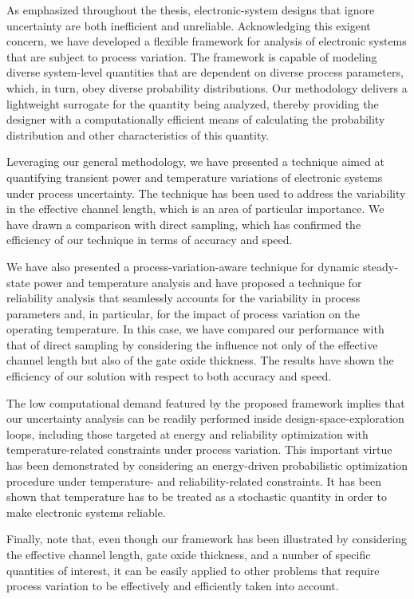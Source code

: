 As emphasized throughout the thesis, electronic-system designs that ignore
uncertainty are both inefficient and unreliable. Acknowledging this exigent
concern, we have developed a flexible framework for analysis of electronic
systems that are subject to process variation. The framework is capable of
modeling diverse system-level quantities that are dependent on diverse process
parameters, which, in turn, obey diverse probability distributions. Our
methodology delivers a lightweight surrogate for the quantity being analyzed,
thereby providing the designer with a computationally efficient means of
calculating the probability distribution and other characteristics of this
quantity.

Leveraging our general methodology, we have presented a technique aimed at
quantifying transient power and temperature variations of electronic systems
under process uncertainty. The technique has been used to address the
variability in the effective channel length, which is an area of particular
importance. We have drawn a comparison with direct sampling, which has confirmed
the efficiency of our technique in terms of accuracy and speed.

We have also presented a process-variation-aware technique for dynamic
steady-state power and temperature analysis and have proposed a technique for
reliability analysis that seamlessly accounts for the variability in process
parameters and, in particular, for the impact of process variation on the
operating temperature. In this case, we have compared our performance with that
of direct sampling by considering the influence not only of the effective
channel length but also of the gate oxide thickness. The results have shown the
efficiency of our solution with respect to both accuracy and speed.

The low computational demand featured by the proposed framework implies that our
uncertainty analysis can be readily performed inside design-space-exploration
loops, including those targeted at energy and reliability optimization with
temperature-related constraints under process variation. This important virtue
has been demonstrated by considering an energy-driven probabilistic optimization
procedure under temperature- and reliability-related constraints. It has been
shown that temperature has to be treated as a stochastic quantity in order to
make electronic systems reliable.

Finally, note that, even though our framework has been illustrated by
considering the effective channel length, gate oxide thickness, and a number of
specific quantities of interest, it can be easily applied to other problems that
require process variation to be effectively and efficiently taken into account.
